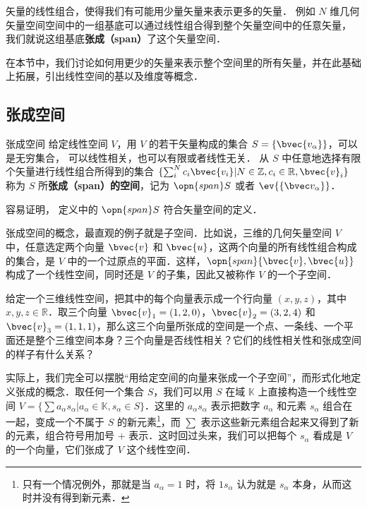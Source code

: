 


矢量的线性组合，使得我们有可能用少量矢量来表示更多的矢量． 例如 $N$ 维几何矢量空间空间中的一组基底可以通过线性组合得到整个矢量空间中的任意矢量， 我们就说这组基底\textbf{张成（span）}了这个矢量空间． 

在本节中，我们讨论如何用更少的矢量来表示整个空间里的所有矢量，并在此基础上拓展，引出线性空间的基以及维度等概念．

\subsection{张成空间}

\begin{definition}{张成空间}\label{VecSpn_def1}
给定线性空间 $V$，用 $V$ 的若干矢量构成的集合 $S=\{\bvec{v_\alpha}\}$，可以是无穷集合， 可以线性相关，也可以有限或者线性无关． 从 $S$ 中任意地选择有限个矢量进行线性组合所得到的集合 $\{\sum_i^N c_i\bvec{v_i}|N\in\mathbb{Z}, c_i\in\mathbb{R}, \bvec{v}_i\}$ 称为 $S$ 所\textbf{张成（span）的空间}，记为 $\opn{span} S$ 或者 $\ev{\{\bvec v_\alpha\}}$．
\end{definition}
容易证明， 定义中的 $\opn{span} S$ 符合矢量空间的定义．

张成空间的概念，最直观的例子就是子空间．比如说，三维的几何矢量空间 $V$ 中，任意选定两个向量 $\bvec{v}$ 和 $\bvec{u}$，这两个向量的所有线性组合构成的集合，是 $V$ 中的一个过原点的平面．这样，$\opn{span}\{\bvec{v}, \bvec{u}\}$ 构成了一个线性空间，同时还是 $V$ 的子集，因此又被称作 $V$ 的一个子空间．

\begin{exercise}{}\label{VecSpn_exe1}
给定一个三维线性空间，把其中的每个向量表示成一个行向量 $(x,y,z)$，其中 $x,y,z\in\mathbb{R}$．取三个向量 $\bvec{v}_1=(1,2,0)$，$\bvec{v}_2=(3,2,4)$ 和 $\bvec{v}_3=(1,1,1)$，那么这三个向量所张成的空间是一个点、一条线、一个平面还是整个三维空间本身？三个向量是否线性相关？它们的线性相关性和张成空间的样子有什么关系？
\end{exercise}

实际上，我们完全可以摆脱“用给定空间的向量来张成一个子空间”，而形式化地定义张成的概念．取任何一个集合 $S$，我们可以用 $S$ 在域 $\mathbb{K}$ 上直接构造一个线性空间 $V=\{\sum a_\alpha s_\alpha|a_\alpha\in\mathbb{K}, s_\alpha\in S\}$．这里的 $a_\alpha s_\alpha$ 表示把数字 $a_\alpha$ 和元素 $s_\alpha$ 组合在一起，变成一个不属于 $S$ 的新元素\footnote{只有一个情况例外，那就是当 $a_\alpha=1$ 时，将 $1s_\alpha$ 认为就是 $s_\alpha$ 本身，从而这时并没有得到新元素．}，而 $\sum$ 表示这些新元素组合起来又得到了新的元素，组合符号用加号 $+$ 表示．这时回过头来，我们可以把每个 $s_\alpha$ 看成是 $V$ 的一个向量，它们张成了 $V$ 这个线性空间．

